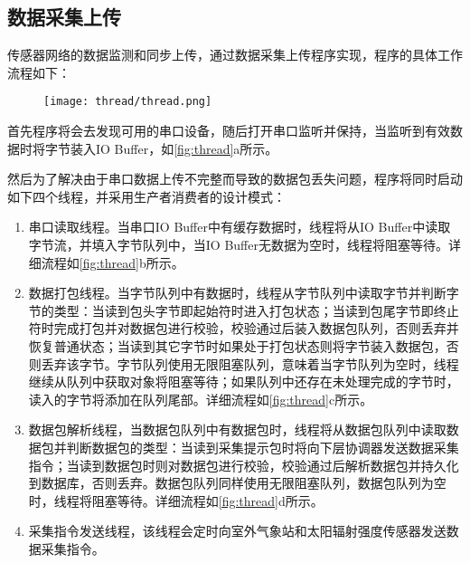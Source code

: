 	\subsection{数据采集上传}
	传感器网络的数据监测和同步上传，通过数据采集上传程序实现，程序的具体工作流程如下：
	\begin{figure}[!htp]
		\centering
		\texttt{[image: thread/thread.png]}
	\end{figure}
首先程序将会去发现可用的串口设备，随后打开串口监听并保持，当监听到有效数据时将字节装入IO Buffer，如\ref{fig:thread}a所示。

然后为了解决由于串口数据上传不完整而导致的数据包丢失问题，程序将同时启动如下四个线程，并采用生产者消费者的设计模式：
	\begin{enumerate}
		\item 串口读取线程。当串口IO Buffer中有缓存数据时，线程将从IO Buffer中读取字节流，并填入字节队列中，当IO Buffer无数据为空时，线程将阻塞等待。详细流程如\ref{fig:thread}b所示。
		\item 数据打包线程。当字节队列中有数据时，线程从字节队列中读取字节并判断字节的类型：当读到包头字节即起始符时进入打包状态；当读到包尾字节即终止符时完成打包并对数据包进行校验，校验通过后装入数据包队列，否则丢弃并恢复普通状态；当读到其它字节时如果处于打包状态则将字节装入数据包，否则丢弃该字节。字节队列使用无限阻塞队列，意味着当字节队列为空时，线程继续从队列中获取对象将阻塞等待；如果队列中还存在未处理完成的字节时，读入的字节将添加在队列尾部。详细流程如\ref{fig:thread}c所示。
		\item 数据包解析线程，当数据包队列中有数据包时，线程将从数据包队列中读取数据包并判断数据包的类型：当读到采集提示包时将向下层协调器发送数据采集指令；当读到数据包时则对数据包进行校验，校验通过后解析数据包并持久化到数据库，否则丢弃。数据包队列同样使用无限阻塞队列，数据包队列为空时，线程将阻塞等待。详细流程如\ref{fig:thread}d所示。
		\item 采集指令发送线程，该线程会定时向室外气象站和太阳辐射强度传感器发送数据采集指令。
	\end{enumerate}
	
